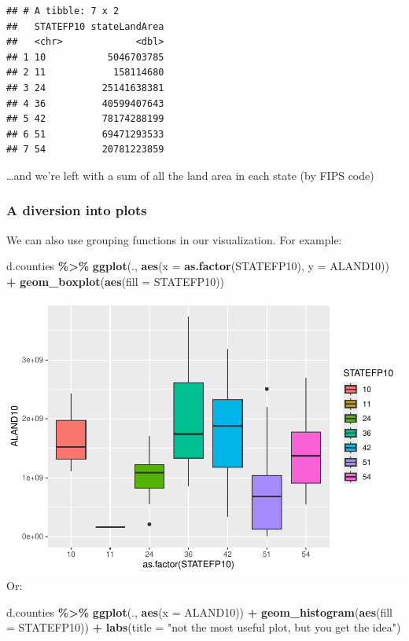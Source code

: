 \documentclass[]{article}
\newenvironment{Shaded}{\begin{snugshade}}{\end{snugshade}}
\newcommand{\AttributeTok}[1]{\textcolor[rgb]{0.13,0.29,0.53}{#1}}
\newcommand{\FunctionTok}[1]{\textcolor[rgb]{0.13,0.29,0.53}{\textbf{#1}}}
\newcommand{\NormalTok}[1]{#1}
\newcommand{\SpecialCharTok}[1]{\textcolor[rgb]{0.81,0.36,0.00}{\textbf{#1}}}
\newcommand{\StringTok}[1]{\textcolor[rgb]{0.31,0.60,0.02}{#1}}
\begin{document}
\begin{verbatim}
## # A tibble: 7 x 2
##   STATEFP10 stateLandArea
##   <chr>             <dbl>
## 1 10           5046703785
## 2 11            158114680
## 3 24          25141638381
## 4 36          40599407643
## 5 42          78174288199
## 6 51          69471293533
## 7 54          20781223859
\end{verbatim}

\ldots and we're left with a sum of all the land area in each state (by
FIPS code)

\subsubsection{A diversion into plots}\label{a-diversion-into-plots}

We can also use grouping functions in our visualization. For example:

\begin{Shaded}
\begin{Highlighting}[]
\NormalTok{d.counties }\SpecialCharTok{\%\textgreater{}\%} 
  \FunctionTok{ggplot}\NormalTok{(., }\FunctionTok{aes}\NormalTok{(}\AttributeTok{x =} \FunctionTok{as.factor}\NormalTok{(STATEFP10), }\AttributeTok{y =}\NormalTok{ ALAND10)) }\SpecialCharTok{+}
  \FunctionTok{geom\_boxplot}\NormalTok{(}\FunctionTok{aes}\NormalTok{(}\AttributeTok{fill =}\NormalTok{ STATEFP10))}
\end{Highlighting}
\end{Shaded}

\includegraphics{lab01_files/figure-latex/plots-1.pdf} Or:

\begin{Shaded}
\begin{Highlighting}[]
\NormalTok{d.counties }\SpecialCharTok{\%\textgreater{}\%} 
  \FunctionTok{ggplot}\NormalTok{(., }\FunctionTok{aes}\NormalTok{(}\AttributeTok{x =}\NormalTok{ ALAND10)) }\SpecialCharTok{+}
  \FunctionTok{geom\_histogram}\NormalTok{(}\FunctionTok{aes}\NormalTok{(}\AttributeTok{fill =}\NormalTok{ STATEFP10)) }\SpecialCharTok{+}
  \FunctionTok{labs}\NormalTok{(}\AttributeTok{title =} \StringTok{"not the most useful plot, but you get the idea"}\NormalTok{)}
\end{Highlighting}
\end{Shaded}
\end{document}
